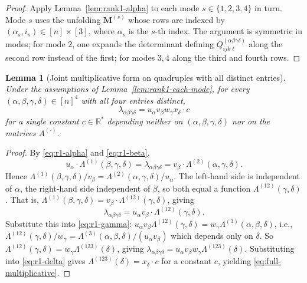 \documentclass[12pt]{article}
\newtheorem{lemma}[theorem]{Lemma}
\theoremstyle{definition}
\begin{document}
\begin{proof}
Apply Lemma~\ref{lem:rank1-alpha} to each mode $s\in\{1,2,3,4\}$ in turn. Mode $s$ uses the
unfolding $\mathbf{M}^{(s)}$ whose rows are indexed by $(\alpha_s,i_s)\in[n]\times[3]$, where
$\alpha_s$ is the $s$-th index. The argument is symmetric in modes; for mode $2$, one
expands the determinant defining $Q^{(\alpha\beta\gamma\delta)}_{ijk\ell}$ along the second
row instead of the first; for modes $3,4$ along the third and fourth rows.
\end{proof}

\begin{lemma}[Joint multiplicative form on quadruples with all distinct entries]\label{lem:jointly-multiplicative}
Under the assumptions of Lemma~\ref{lem:rank1-each-mode}, for every
$(\alpha,\beta,\gamma,\delta)\in[n]^4$ with all four entries distinct,
\begin{equation}\label{eq:full-multiplicative}
\lambda_{\alpha\beta\gamma\delta}=u_\alpha v_\beta w_\gamma x_\delta\cdot c
\end{equation}
for a single constant $c\in\mathbb{R}^*$ depending neither on $(\alpha,\beta,\gamma,\delta)$
nor on the matrices $A^{(\cdot)}$.
\end{lemma}

\begin{proof}
By \eqref{eq:r1-alpha} and \eqref{eq:r1-beta},
\[
u_\alpha\cdot\Lambda^{(1)}(\beta,\gamma,\delta)
=\lambda_{\alpha\beta\gamma\delta}
=v_\beta\cdot\Lambda^{(2)}(\alpha,\gamma,\delta).
\]
Hence $\Lambda^{(1)}(\beta,\gamma,\delta)/v_\beta=\Lambda^{(2)}(\alpha,\gamma,\delta)/u_\alpha$.
The left-hand side is independent of $\alpha$, the right-hand side independent of $\beta$, so
both equal a function $\Lambda^{(12)}(\gamma,\delta)$. That is,
$\Lambda^{(1)}(\beta,\gamma,\delta)=v_\beta\cdot\Lambda^{(12)}(\gamma,\delta)$, giving
\[
\lambda_{\alpha\beta\gamma\delta}=u_\alpha v_\beta\cdot\Lambda^{(12)}(\gamma,\delta).
\]
Substitute this into \eqref{eq:r1-gamma}: $u_\alpha v_\beta\Lambda^{(12)}(\gamma,\delta)=w_\gamma\Lambda^{(3)}(\alpha,\beta,\delta)$,
i.e., $\Lambda^{(12)}(\gamma,\delta)/w_\gamma=\Lambda^{(3)}(\alpha,\beta,\delta)/(u_\alpha v_\beta)$
which depends only on $\delta$. So $\Lambda^{(12)}(\gamma,\delta)=w_\gamma\Lambda^{(123)}(\delta)$,
giving $\lambda_{\alpha\beta\gamma\delta}=u_\alpha v_\beta w_\gamma\Lambda^{(123)}(\delta)$.
Substituting into \eqref{eq:r1-delta} gives $\Lambda^{(123)}(\delta)=x_\delta\cdot c$ for a
constant $c$, yielding \eqref{eq:full-multiplicative}.
\end{proof}
\end{document}
